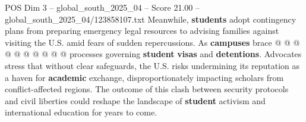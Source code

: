\begin{textsample}{POS Dim 3 – global\_south\_2025\_04 – Score 21.00 – global\_south\_2025\_04/123858107.txt}
Meanwhile, \textbf{students} adopt contingency plans from preparing emergency legal resources to advising families against visiting the U.S. amid fears of sudden repercussions.
As \textbf{campuses} brace @ @ @ @ @ @ @ @ @ @ processes governing \textbf{student} \textbf{visas} and \textbf{detentions}.
Advocates stress that without clear safeguards, the U.S. risks undermining its reputation as a haven for \textbf{academic} exchange, disproportionately impacting scholars from conflict-affected regions.
The outcome of this clash between security protocols and civil liberties could reshape the landscape of \textbf{student} activism and international education for years to come.

\end{textsample}
